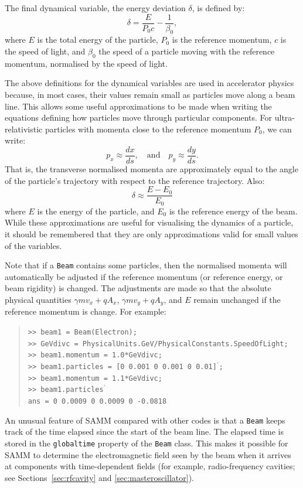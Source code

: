 \documentclass[11pt,twoside,a4paper]{article}
\begin{document}
The final dynamical variable, the energy deviation $\delta$, is defined by:
\[
\delta = \frac{E}{P_0 c} - \frac{1}{\beta_0},
\]
where $E$ is the total energy of the particle, $P_0$ is the reference
momentum, $c$ is the speed of light, and $\beta_0$ the speed of a particle
moving with the reference momentum, normalised by the speed of light.

The above definitions for the dynamical variables are used in accelerator
physics because, in most cases, their values remain small as particles move
along a beam line.  This allows some useful approximations to be made when
writing the equations defining how particles move through particular
components.  For ultra-relativistic particles with momenta close to the
reference momentum $P_0$, we can write:
\[
p_x \approx \frac{dx}{ds}, \quad \textrm{and} \quad  p_y \approx \frac{dy}{ds}.
\]
That is, the transverse normalised momenta are approximately equal to the
angle of the particle's trajectory with respect to the reference trajectory.
Also:
\[
\delta \approx \frac{E - E_0}{E_0}
\]
where $E$ is the energy of the particle, and $E_0$ is the reference energy
of the beam.  While these approximations
are useful for visualising the dynamics of a particle, it should be
remembered that they are only approximations valid for small values of the
variables.

Note that if a \texttt{Beam} contains some particles, then the normalised
momenta will automatically be adjusted if the reference momentum (or
reference energy, or beam rigidity) is changed.  The adjustments are made
so that the absolute physical quantities $\gamma m v_x + q A_x$,
$\gamma m v_y + q A_y$, and $E$ remain unchanged if the reference
momentum is change. For example:
\begin{quote}
\texttt{>> beam1 = Beam(Electron); \\
>> GeVdivc = PhysicalUnits.GeV/PhysicalConstants.SpeedOfLight; \\
>> beam1.momentum = 1.0*GeVdivc; \\
>> beam1.particles = [0 0.001 0 0.001 0 0.01]$^\prime$; \\
>> beam1.momentum = 1.1*GeVdivc; \\
>> beam1.particles$^\prime$ \\
ans =    0    0.0009         0    0.0009         0   -0.0818}
\end{quote}

An unusual feature of SAMM compared with other codes is that a \texttt{Beam}
keeps track of the time elapsed since the start of the beam line.  The
elapsed time is stored in the \texttt{globaltime} property of the \texttt{Beam}
class.  This makes it possible for SAMM to determine the electromagnetic
field seen by the beam when it arrives at components with time-dependent
fields (for example, radio-frequency cavities; see Sections~\ref{sec:rfcavity}
and \ref{sec:masteroscillator}).
\end{document}
